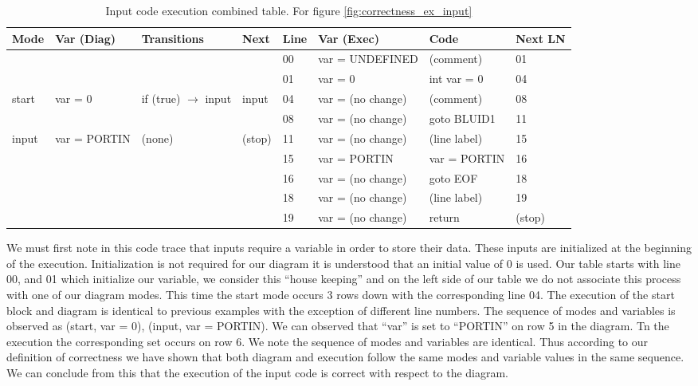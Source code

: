 \begin{table}[htcb]
	\caption{Input code execution combined table. For figure \ref{fig:correctness_ex_input}}
	\centering
	\tablefontsize
		\begin{tabular}{| p{} | p{} | p{} | p{} | p{} | p{} | p{} | p{} |}
			\hline
			\textbf{Mode} 		&	\textbf{Var (Diag)} 		& 	\textbf{Transitions} 		& 	\textbf{Next}		&	\textbf{Line}		&	\textbf{Var (Exec)	}	&	\textbf{Code}	&	\textbf{Next LN} \\
			\hline			
								&								&								&						&	00					& 	var = UNDEFINED			&	(comment)		&	01	\\
			\hline
								&								&								&						&	01					&	var = 0					&	int var = 0		&	04	\\
			\hline
			start 				&	var = 0						&if (true) $\rightarrow$ input	&	input				&	04					&	var = (no change)		& 	(comment)		&	08	\\
			\hline
								&								&								&						&	08					&	var = (no change)		&	goto BLUID1		&	11	\\
			\hline
			input				&	var = PORTIN				&	(none)						&	(stop)				&	11					&	var = (no change)		&	(line label)	&	15	\\
			\hline
								&								&								&						&	15					&	var = PORTIN			&	var = PORTIN	&	16	\\
			\hline
								&								&								&						&	16					&	var = (no change)		&	goto EOF		&	18	\\
			\hline
								&								&								&						&	18					&	var = (no change)		&	(line label)	&	19	\\
			\hline
								&								&								&						&	19					&	var = (no change)		&	return			&	(stop)	\\
			\hline
		\end{tabular}
	\label{table:InputExecCombined}
\end{table}

We must first note in this code trace that inputs require a variable in order to store
their data. These inputs are initialized at the beginning of the execution. 
Initialization is not required for our diagram it is understood that an initial
value of 0 is used. Our table starts with line 00, and 01 which initialize 
our variable, we consider this ``house keeping'' and on the left side of our table we
do not associate this process with one of our diagram modes. This time the start
mode occurs 3 rows down with the corresponding line 04. The execution of the start block 
and diagram is identical to previous examples with the exception of different line numbers.
The sequence of modes and variables is observed as {(start, var = 0), (input, var = PORTIN)}.
We can observed that ``var'' is set to ``PORTIN'' on row 5 in the diagram. Tn the 
execution the corresponding set occurs on row 6. We note the sequence of modes and variables are identical.
Thus according to our definition of correctness we have shown that both diagram
and execution follow the same modes and variable values in the same sequence. 
We can conclude from this that the execution of the input code is correct
with respect to the diagram.

